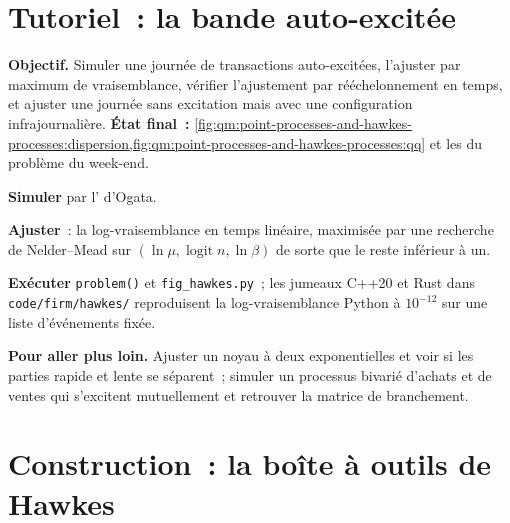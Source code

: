 \section{Tutoriel~: la bande auto-excitée}\label{tut:qm:point-processes-and-hawkes-processes:tape}

\begin{tutorial}
\textbf{Objectif.} Simuler une journée de transactions auto-excitées, l'ajuster par maximum de vraisemblance, vérifier l'ajustement
par rééchelonnement en temps, et ajuster une journée sans excitation mais avec une configuration infrajournalière. \textbf{État final~:}
\cref{fig:qm:point-processes-and-hawkes-processes:dispersion,fig:qm:point-processes-and-hawkes-processes:qq}
et les  du problème du week-end.
\begin{tutsteps}
\item \textbf{Simuler} par l' d'Ogata.
\label{lst:qm:point-processes-and-hawkes-processes:thinning}
\item \textbf{Ajuster}~: la log-vraisemblance en temps linéaire, maximisée par une recherche de Nelder--Mead sur $(\ln\mu,
\operatorname{logit}n, \ln\beta)$ de sorte que le  reste inférieur à un.
\label{lst:qm:point-processes-and-hawkes-processes:loglik}
\item \textbf{Exécuter} \texttt{problem()} et \texttt{fig\_hawkes.py}~; les jumeaux C++20 et Rust dans
\texttt{code/firm/hawkes/} reproduisent la log-vraisemblance Python à $10^{-12}$ sur une liste d'événements fixée.
\end{tutsteps}
\textbf{Pour aller plus loin.} Ajuster un noyau à deux exponentielles et voir si les parties rapide et lente se séparent~;
simuler un processus bivarié d'achats et de ventes qui s'excitent mutuellement et retrouver la matrice de branchement.
\end{tutorial}

\section{Construction~: la boîte à outils de Hawkes}\label{bld:qm:point-processes-and-hawkes-processes:hawkes}

